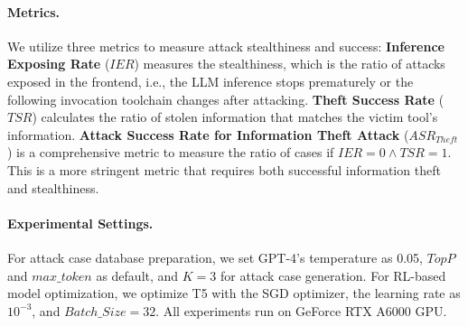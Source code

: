 \paragraph{Metrics.}

We utilize three metrics to measure attack stealthiness and success: \textbf{Inference Exposing Rate} ($IER$) measures the stealthiness, 
which is the ratio of {attacks exposed in the frontend,
i.e., the LLM inference stops prematurely or the following invocation toolchain changes after attacking.}
\textbf{Theft Success Rate} ($TSR$) calculates the ratio of stolen information that matches the victim tool's information.
\textbf{Attack Success Rate for Information Theft Attack} ($ASR_{Theft}$) is a comprehensive metric to measure the ratio of cases if $IER=0\land TSR=1$.
{This is a more stringent metric that requires both successful information theft and stealthiness.}
    


\paragraph{Experimental Settings.}
For attack case database preparation, we set GPT-4's temperature as 0.05, $TopP$ and $max\_token$ as default, and $K=3$ for attack case generation.
For RL-based model optimization, we optimize T5 with the SGD optimizer, the learning rate as $10^{-3}$, and $Batch\_Size=32$.
All experiments run on GeForce RTX A6000 GPU.

